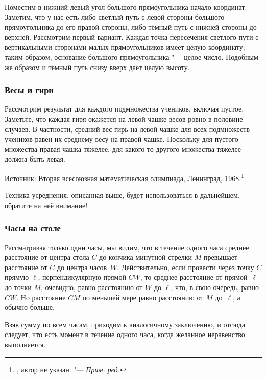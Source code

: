 \documentclass[twoside]{book}
\begin{document}
Поместим в нижний левый угол большого прямоугольника начало координат.
Заметим, что у нас есть либо светлый путь с левой стороны большого прямоугольника до его правой стороны, либо тёмный путь с нижней стороны до верхней.
Рассмотрим первый вариант.
Каждая точка пересечения светлого пути с вертикальными сторонами малых прямоугольников имеет целую координату; таким образом, основание большого прямоугольника "--- целое число.
Подобным же образом и тёмный путь снизу вверх даёт целую высоту.

\subsubsection*{Весы и гири} %

Рассмотрим результат для каждого подмножества учеников, включая пустое.
Заметьте, что каждая гиря окажется на левой чашке весов ровно в половине случаев.
В частности, средний вес гирь на левой чашке для всех подмножеств учеников равен их среднему весу на правой чашке.
Поскольку для пустого множества правая чашка тяжелее, 
для какого-то другого множества тяжелее должна быть левая.\heart

\medskip
{\small

Источник: Вторая всесоюзная математическая олимпиада, Ленинград, 1968.\footnote{\cite[№110]{ВсМО}, автор не указан. "--- \emph{Прим. ред.}}

}

  \medskip
Техника усреднения, описанная выше, будет использоваться в дальнейшем, обратите на неё внимание!

\subsubsection*{Часы на столе} %

Рассматривая только одни часы, 
мы видим, что в течение одного часа среднее расстояние от центра стола $C$ до кончика минутной стрелки $M$ превышает расстояние от $C$ до центра часов~$W$.
Действительно, если провести через точку $C$ прямую $\ell$, перпендикулярную прямой $CW$, 
то среднее расстояние от прямой~$\ell$ до точки $M$, очевидно, равно расстоянию от $W$ до $\ell$,
что, в свою очередь, равно $CW$.
Но расстояние $CM$ по меньшей мере равно расстоянию от $M$ до~$\ell$, а обычно больше.

Взяв сумму по всем часам, приходим к аналогичному заключению, и отсюда следует, что есть момент в течение одного часа, когда желанное неравенство выполняется.\heart
\end{document}

